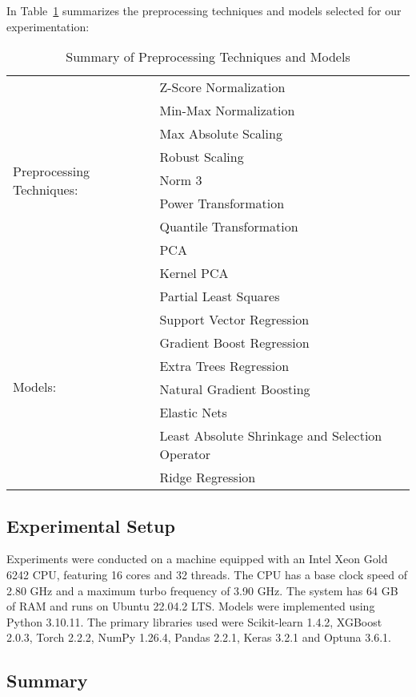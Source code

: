 In Table~\ref{tab:preprocessing-models} summarizes the preprocessing techniques and models selected for our experimentation:

\begin{table}[ht]
\centering
\begin{tabularx}{\columnwidth}{lX}
\toprule
\multirow{9}{*}{Preprocessing Techniques:} & Z-Score Normalization \\
                                           & Min-Max Normalization \\
                                           & Max Absolute Scaling \\
                                           & Robust Scaling \\
                                           & Norm 3 \\
                                           & Power Transformation \\
                                           & Quantile Transformation \\
                                           & PCA \\
                                           & Kernel PCA \\
\midrule
\multirow{8}{*}{Models:}                   & Partial Least Squares \\
                                           & Support Vector Regression \\
                                           & Gradient Boost Regression \\
                                           & Extra Trees Regression \\
                                           & Natural Gradient Boosting \\
                                           & Elastic Nets \\
                                           & Least Absolute Shrinkage and Selection Operator \\
                                           & Ridge Regression \\
\bottomrule
\end{tabularx}
\caption{Summary of Preprocessing Techniques and Models}
\label{tab:preprocessing-models}
\end{table}

\subsection{Experimental Setup}
Experiments were conducted on a machine equipped with an Intel Xeon Gold 6242 CPU, featuring 16 cores and 32 threads.
The CPU has a base clock speed of 2.80 GHz and a maximum turbo frequency of 3.90 GHz.
The system has 64 GB of RAM and runs on Ubuntu 22.04.2 LTS.
Models were implemented using Python 3.10.11.
The primary libraries used were Scikit-learn 1.4.2, XGBoost 2.0.3, Torch 2.2.2, NumPy 1.26.4, Pandas 2.2.1, Keras 3.2.1 and Optuna 3.6.1.




\subsection{Summary}
